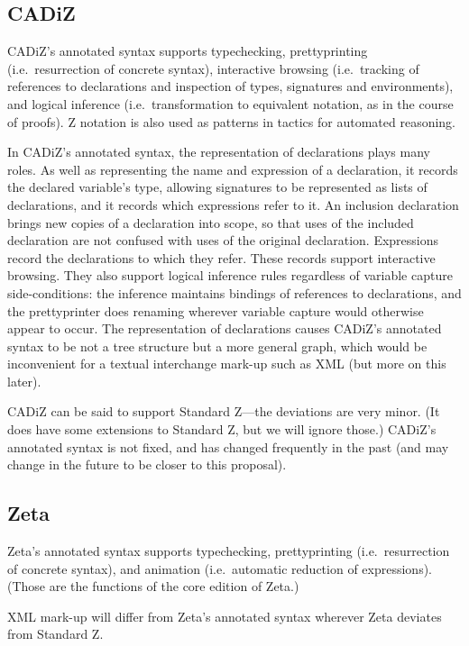 \documentclass{llncs}  %
\newcommand{\CADiZ}{CADiZ}
\newcommand{\Zeta}{Zeta}
\begin{document}
\subsection{\CADiZ}

\CADiZ's annotated syntax supports typechecking,
prettyprinting (i.e.\ resurrection of concrete syntax),
interactive browsing (i.e.\ tracking of references to declarations
and inspection of types, signatures and environments),
and logical inference (i.e.\ transformation to equivalent notation,
as in the course of proofs).
Z notation is also used as patterns in tactics for automated reasoning.

In \CADiZ's annotated syntax,
the representation of declarations plays many roles.
As well as representing the name and expression of a declaration,
it records the declared variable's type,
allowing signatures to be represented as lists of declarations,
and it records which expressions refer to it.
An inclusion declaration brings new copies of a declaration into scope,
so that uses of the included declaration are not
confused with uses of the original declaration.
Expressions record the declarations to which they refer.
These records support interactive browsing.
They also support logical inference rules
regardless of variable capture side-conditions:
the inference maintains bindings of references to declarations,
and the prettyprinter does renaming
wherever variable capture would otherwise appear to occur.
The representation of declarations causes \CADiZ's annotated syntax
to be not a tree structure but a more general graph,
which would be inconvenient for a textual interchange mark-up such as XML
(but more on this later).

\CADiZ\cite{CADiZ} can be said to support Standard Z---the deviations
are very minor.
(It does have some extensions to Standard Z, but we will ignore those.)
\CADiZ's annotated syntax is not fixed, and has changed frequently in the
past (and may change in the future to be closer to this proposal). 

\subsection{\Zeta}

\Zeta's annotated syntax supports typechecking,
prettyprinting (i.e.\ resurrection of concrete syntax),
and animation (i.e.\ automatic reduction of expressions).
(Those are the functions of the core edition of \Zeta.)

XML mark-up will differ from \Zeta's annotated syntax
wherever \Zeta\cite{Zeta} deviates from Standard Z.
\end{document}
